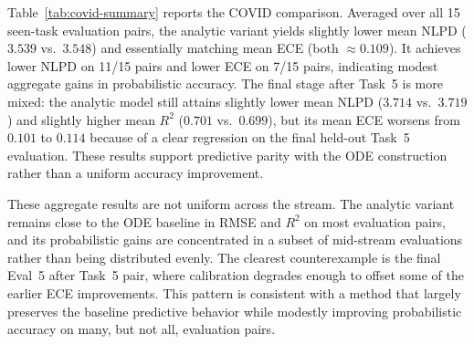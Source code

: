 \documentclass{article}
\theoremstyle{plain}
\theoremstyle{definition}
\theoremstyle{remark}
\begin{document}
\begin{center}
\begin{minipage}{\columnwidth}
\captionsetup{hypcap=false}
\label{tab:covid-summary}
\centering
\begin{scriptsize}
\end{scriptsize}
\end{minipage}
\end{center}

Table~\ref{tab:covid-summary} reports the COVID comparison. Averaged over all 15 seen-task evaluation pairs, the analytic variant yields slightly lower mean NLPD ($3.539$ vs.\ $3.548$) and essentially matching mean ECE (both $\approx\!0.109$). It achieves lower NLPD on 11/15 pairs and lower ECE on 7/15 pairs, indicating modest aggregate gains in probabilistic accuracy. The final stage after Task~5 is more mixed: the analytic model still attains slightly lower mean NLPD ($3.714$ vs.\ $3.719$) and slightly higher mean $R^2$ ($0.701$ vs.\ $0.699$), but its mean ECE worsens from $0.101$ to $0.114$ because of a clear regression on the final held-out Task~5 evaluation. These results support predictive parity with the ODE construction rather than a uniform accuracy improvement.

These aggregate results are not uniform across the stream. The analytic variant remains close to the ODE baseline in RMSE and $R^2$ on most evaluation pairs, and its probabilistic gains are concentrated in a subset of mid-stream evaluations rather than being distributed evenly. The clearest counterexample is the final Eval~5 after Task~5 pair, where calibration degrades enough to offset some of the earlier ECE improvements. This pattern is consistent with a method that largely preserves the baseline predictive behavior while modestly improving probabilistic accuracy on many, but not all, evaluation pairs.
\end{document}
